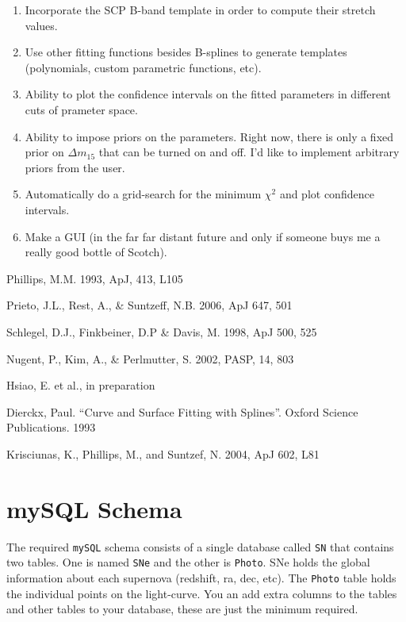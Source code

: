 \documentclass[12pt]{article}
\newcommand{\noun}[1]{\textsc{#1}}
\begin{document}
\begin{enumerate}
\item Incorporate the SCP B-band template in order to compute their stretch
values.
\item Use other fitting functions besides B-splines to generate templates
(polynomials, custom parametric functions, etc).
\item Ability to plot the confidence intervals on the fitted parameters
in different cuts of prameter space.
\item Ability to impose priors on the parameters. Right now, there is only
a fixed prior on $\Delta m_{15}$ that can be turned on and off. I'd
like to implement arbitrary priors from the user.
\item Automatically do a grid-search for the minimum $\chi^{2}$ and plot
confidence intervals.
\item Make a GUI (in the far far distant future and only if someone buys
me a really good bottle of Scotch).
\end{enumerate}
\begin{thebibliography}{2}
Phillips, M.M. 1993, ApJ, 413, L105

Prieto, J.L., Rest, A., \& Suntzeff, N.B. 2006,
ApJ 647, 501

Schlegel, D.J., Finkbeiner, D.P \& Davis, M.
1998, ApJ 500, 525

Nugent, P., Kim, A., \& Perlmutter, S. 2002,
PASP, 14, 803

Hsiao, E. et al., in preparation

Dierckx, Paul. {}``Curve and Surface Fitting
with Splines''. Oxford Science Publications. 1993

Krisciunas, K., Phillips, M., and Suntzef,
N. 2004, ApJ 602, L81

\end{thebibliography}
\appendix

\section{mySQL Schema}

The required \texttt{mySQL} schema consists of a single database called
\noun{}\texttt{SN} that contains two tables. One is named \texttt{\noun{SN}}\texttt{e}
and the other is \texttt{Photo}. SNe holds the global information
about each supernova (redshift, ra, dec, etc). The \texttt{Photo}
table holds the individual points on the light-curve. You an add extra
columns to the tables and other tables to your database, these are
just the minimum required.
\end{document}
